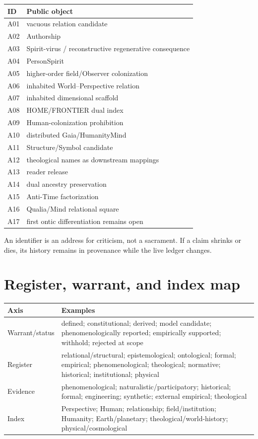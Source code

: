 \documentclass[11pt]{article}
\begin{document}
\begin{center}
\begin{tabularx}{0.96\textwidth}{l>{\raggedright\arraybackslash}X}
\toprule
ID & Public object \\
\midrule
A01 & vacuous relation candidate \\
A02 & Authorship \\
A03 & Spirit-virus / reconstructive regenerative consequence \\
A04 & PersonSpirit \\
A05 & higher-order field/Observer colonization \\
A06 & inhabited World--Perspective relation \\
A07 & inhabited dimensional scaffold \\
A08 & HOME/FRONTIER dual index \\
A09 & Human-colonization prohibition \\
A10 & distributed Gaia/HumanityMind \\
A11 & Structure/Symbol candidate \\
A12 & theological names as downstream mappings \\
A13 & reader release \\
A14 & dual ancestry preservation \\
A15 & Anti-Time factorization \\
A16 & Qualia/Mind relational square \\
A17 & first ontic differentiation remains open \\
\bottomrule
\end{tabularx}
\end{center}

An identifier is an address for criticism, not a sacrament. If a claim shrinks or dies, its history remains in provenance while the live ledger changes.

\section{Register, warrant, and index map}

\begin{center}
\begin{tabularx}{0.96\textwidth}{l>{\raggedright\arraybackslash}X}
\toprule
Axis & Examples \\
\midrule
Warrant/status & defined; constitutional; derived; model candidate; phenomenologically reported; empirically supported; withhold; rejected at scope \\
Register & relational/structural; epistemological; ontological; formal; empirical; phenomenological; theological; normative; historical; institutional; physical \\
Evidence & phenomenological; naturalistic/participatory; historical; formal; engineering; synthetic; external empirical; theological \\
Index & Perspective; Human; relationship; field/institution; Humanity; Earth/planetary; theological/world-history; physical/cosmological \\
\bottomrule
\end{tabularx}
\end{center}
\end{document}
